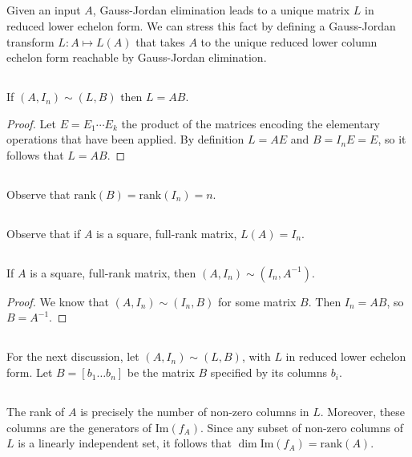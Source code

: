 \documentclass{proc-l}
\theoremstyle{definition}
\theoremstyle{remark}
\numberwithin{equation}{section}
\newcommand{\rank}[1]{\textrm{rank}({#1})}
\newcommand{\im}[1]{\textrm{Im}({#1})}
\begin{document}
\subsection{}
Given an input $A$, Gauss-Jordan elimination leads to a unique matrix $L$ in reduced lower echelon form. We can stress this fact by defining a Gauss-Jordan transform $L: A\mapsto L(A)$ that takes $A$ to the unique reduced lower column echelon form reachable by Gauss-Jordan elimination.

\subsection{}
If $(A, I_n) \sim (L, B)$ then $L=AB$.
\begin{proof}
Let $E = E_1\cdots E_k$ the product of the matrices encoding the elementary operations that have been applied. By definition $L = AE$ and $B = I_n E = E$, so it follows that $L=AB$.
\end{proof}

\subsection{}
Observe that $\rank{B} = \rank{I_n} = n$.

\subsection{}
Observe that if $A$ is a square, full-rank matrix, $L(A) = I_n$.

\subsection{}
If $A$ is a square, full-rank matrix, then $(A, I_n) \sim (I_n, A^{-1})$.
\begin{proof}
We know that $(A, I_n) \sim (I_n, B)$ for some matrix $B$. Then $I_n = AB$, so $B=A^{-1}$.
\end{proof}

\subsection{}
For the next discussion, let $(A, I_n) \sim (L, B)$, with $L$ in reduced lower echelon form. Let $B=[b_1 \ldots b_n]$ be the matrix $B$ specified by its columns $b_i$.

\subsection{}
The rank of $A$ is precisely the number of non-zero columns in $L$. Moreover, these columns are the generators of $\im{f_A}$. Since any subset of non-zero columns of $L$ is a linearly independent set, it follows that $\dim\im{f_A} = \rank{A}$.
\end{document}
